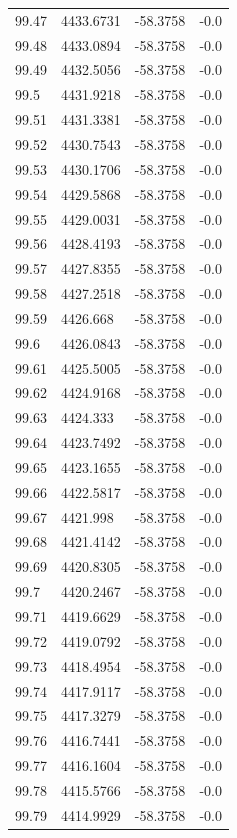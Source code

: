 \begin{table}[H]
\begin{tabular}{llll}
99.47 & 4433.6731 & -58.3758 & -0.0 \\
99.48 & 4433.0894 & -58.3758 & -0.0 \\
99.49 & 4432.5056 & -58.3758 & -0.0 \\
99.5 & 4431.9218 & -58.3758 & -0.0 \\
99.51 & 4431.3381 & -58.3758 & -0.0 \\
99.52 & 4430.7543 & -58.3758 & -0.0 \\
99.53 & 4430.1706 & -58.3758 & -0.0 \\
99.54 & 4429.5868 & -58.3758 & -0.0 \\
99.55 & 4429.0031 & -58.3758 & -0.0 \\
99.56 & 4428.4193 & -58.3758 & -0.0 \\
99.57 & 4427.8355 & -58.3758 & -0.0 \\
99.58 & 4427.2518 & -58.3758 & -0.0 \\
99.59 & 4426.668 & -58.3758 & -0.0 \\
99.6 & 4426.0843 & -58.3758 & -0.0 \\
99.61 & 4425.5005 & -58.3758 & -0.0 \\
99.62 & 4424.9168 & -58.3758 & -0.0 \\
99.63 & 4424.333 & -58.3758 & -0.0 \\
99.64 & 4423.7492 & -58.3758 & -0.0 \\
99.65 & 4423.1655 & -58.3758 & -0.0 \\
99.66 & 4422.5817 & -58.3758 & -0.0 \\
99.67 & 4421.998 & -58.3758 & -0.0 \\
99.68 & 4421.4142 & -58.3758 & -0.0 \\
99.69 & 4420.8305 & -58.3758 & -0.0 \\
99.7 & 4420.2467 & -58.3758 & -0.0 \\
99.71 & 4419.6629 & -58.3758 & -0.0 \\
99.72 & 4419.0792 & -58.3758 & -0.0 \\
99.73 & 4418.4954 & -58.3758 & -0.0 \\
99.74 & 4417.9117 & -58.3758 & -0.0 \\
99.75 & 4417.3279 & -58.3758 & -0.0 \\
99.76 & 4416.7441 & -58.3758 & -0.0 \\
99.77 & 4416.1604 & -58.3758 & -0.0 \\
99.78 & 4415.5766 & -58.3758 & -0.0 \\
99.79 & 4414.9929 & -58.3758 & -0.0 \\

\end{tabular}
\end{table}
